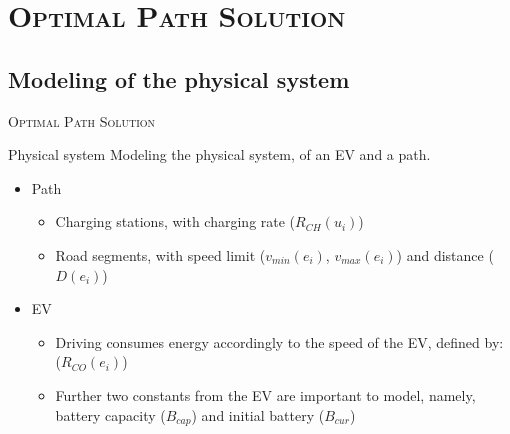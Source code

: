 \section{\scshape Optimal Path Solution}
\subsection{Modeling of the physical system}

\begin{frame}
\center \huge \scshape Optimal Path Solution
\end{frame}

\begin{frame}{Physical system}
Modeling the physical system, of an EV and a path.
\begin{figure}[!htb]
\centering
\end{figure} 
\begin{itemize}
\item Path
\begin{itemize}
\item Charging stations, with charging rate ($R_{CH}(u_i)$)
\item Road segments, with speed limit ($v_{min}(e_i)$, $v_{max}(e_i)$) and distance ($D(e_i)$) 
\end{itemize}
\item EV
\begin{itemize}
\item Driving consumes energy accordingly to the speed of the EV, defined by: ($R_{CO}(e_i)$)
\item Further two constants from the EV are important to model, namely, battery capacity ($B_{cap}$) and initial battery ($B_{cur}$)
\end{itemize}
\end{itemize} 
\end{frame}
